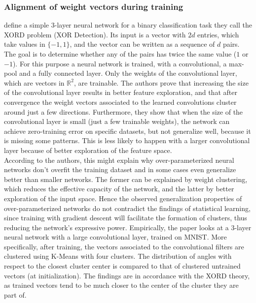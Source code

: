 \subsubsection*{Alignment of weight vectors during training}
\cite{brutzkus2019larger} define a simple 3-layer neural network for a binary classification task they call the XORD problem (XOR Detection). Its input is a vector with $2d$ entries, which take values in $\{-1, 1\}$, and the vector can be written as a sequence of $d$ pairs. The goal is to determine whether any of the pairs has twice the same value ($1$ or $-1$). For this purpose a neural network is trained, with a convolutional, a max-pool and a fully connected layer. Only the weights of the convolutional layer, which are vectors in $\mathbb{R}^2$, are trainable. The authors prove that increasing the size of the convolutional layer results in better feature exploration, and that after convergence the weight vectors associated to the learned convolutions cluster around just a few directions. Furthermore, they show that when the size of the convolutional layer is small (just a few trainable weights), the network can achieve zero-training error on specific datasets, but not generalize well, because it is missing some patterns. This is less likely to happen with a larger convolutional layer because of better exploration of the feature space. \\

According to the authors, this might explain why over-parameterized neural networks don't overfit the training dataset and in some cases even generalize better than smaller networks. The former can be explained by weight clustering, which reduces the effective capacity of the network, and the latter by better exploration of the input space. Hence the observed generalization properties of over-parameterized networks do not contradict the findings of statistical learning, since training with gradient descent will facilitate the formation of clusters, thus reducing the network's expressive power. Empirically, the paper looks at a 3-layer neural network with a large convolutional layer, trained on MNIST. More specifically, after training, the vectors associated to the convolutional filters are clustered using K-Means with four clusters. The distribution of angles with respect to the closest cluster center is compared to that of clustered untrained vectors (at initialization). The findings are in accordance with the XORD theory, as trained vectors tend to be much closer to the center of the cluster they are part of.\\

